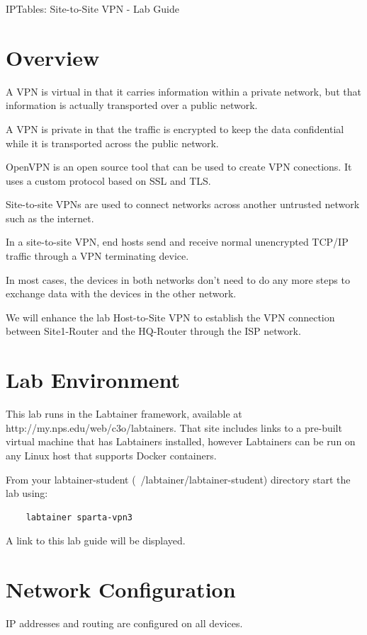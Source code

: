 


\begin{center}
{\LARGE IPTables: Site-to-Site VPN - Lab Guide}
\vspace{0.1in}\\
\end{center}

\copyrightnotice

\section{Overview}
A VPN is virtual in that it carries information within a private network, but that information is actually transported over a public network.

A VPN is private in that the traffic is encrypted to keep the data confidential while it is transported across the public network.

OpenVPN is an open source tool that can be used to create VPN conections. It uses a custom protocol based on SSL and TLS.

Site-to-site VPNs are used to connect networks across another untrusted network such as the internet.

In a site-to-site VPN, end hosts send and receive normal unencrypted TCP/IP traffic through a VPN terminating device.

In most cases, the devices in both networks don't need to do any more steps to exchange data with the devices in the other network.

We will enhance the lab Host-to-Site VPN to establish the VPN connection between Site1-Router and the HQ-Router through the ISP network.

\section{Lab Environment}
This lab runs in the Labtainer framework,
available at http://my.nps.edu/web/c3o/labtainers.
That site includes links to a pre-built virtual machine
that has Labtainers installed, however Labtainers can
be run on any Linux host that supports Docker containers.

From your labtainer-student (~/labtainer/labtainer-student) directory start the lab using:
\begin{verbatim}
    labtainer sparta-vpn3
\end{verbatim}
\noindent A link to this lab guide will be displayed.

\section{Network Configuration}
IP addresses and routing are configured on all devices.

